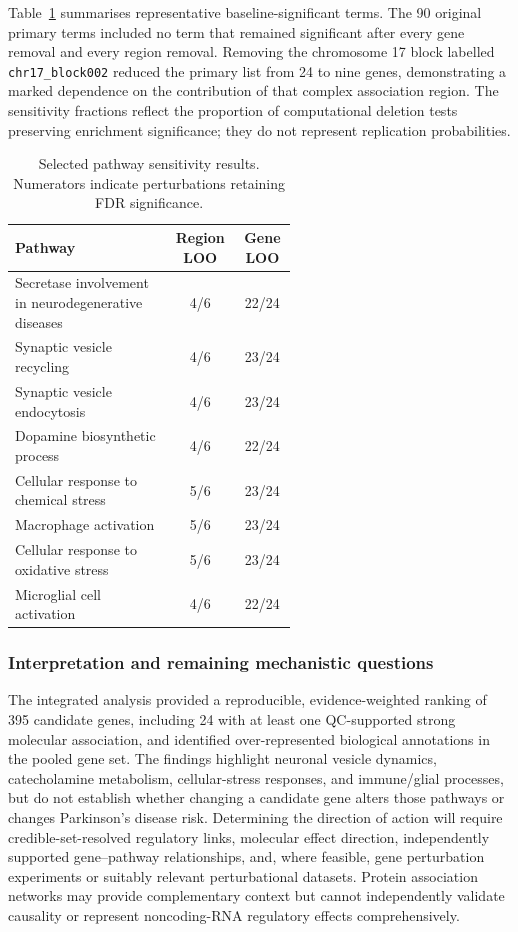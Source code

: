 \documentclass[11pt,a4paper]{article}
\begin{document}
Table~\ref{tab:step14_sensitivity} summarises representative baseline-significant terms. The 90 original primary terms included no term that remained significant after every gene removal and every region removal. Removing the chromosome 17 block labelled \texttt{chr17\_block002} reduced the primary list from 24 to nine genes, demonstrating a marked dependence on the contribution of that complex association region. The sensitivity fractions reflect the proportion of computational deletion tests preserving enrichment significance; they do not represent replication probabilities.

\begin{table}[!htbp]
\centering\scriptsize
\caption{Selected pathway sensitivity results. Numerators indicate perturbations retaining FDR significance.}
\label{tab:step14_sensitivity}
\begin{tabular}{@{}p{0.56\linewidth}cc@{}}
\toprule Pathway & Region LOO & Gene LOO\\\midrule
Secretase involvement in neurodegenerative diseases & 4/6 & 22/24\\
Synaptic vesicle recycling & 4/6 & 23/24\\
Synaptic vesicle endocytosis & 4/6 & 23/24\\
Dopamine biosynthetic process & 4/6 & 22/24\\
Cellular response to chemical stress & 5/6 & 23/24\\
Macrophage activation & 5/6 & 23/24\\
Cellular response to oxidative stress & 5/6 & 23/24\\
Microglial cell activation & 4/6 & 22/24\\
\bottomrule\end{tabular}
\end{table}

\subsubsection{Interpretation and remaining mechanistic questions}
The integrated analysis provided a reproducible, evidence-weighted ranking of 395 candidate genes, including 24 with at least one QC-supported strong molecular association, and identified over-represented biological annotations in the pooled gene set. The findings highlight neuronal vesicle dynamics, catecholamine metabolism, cellular-stress responses, and immune/glial processes, but do not establish whether changing a candidate gene alters those pathways or changes Parkinson's disease risk. Determining the direction of action will require credible-set-resolved regulatory links, molecular effect direction, independently supported gene--pathway relationships, and, where feasible, gene perturbation experiments or suitably relevant perturbational datasets. Protein association networks may provide complementary context but cannot independently validate causality or represent noncoding-RNA regulatory effects comprehensively.
\end{document}
